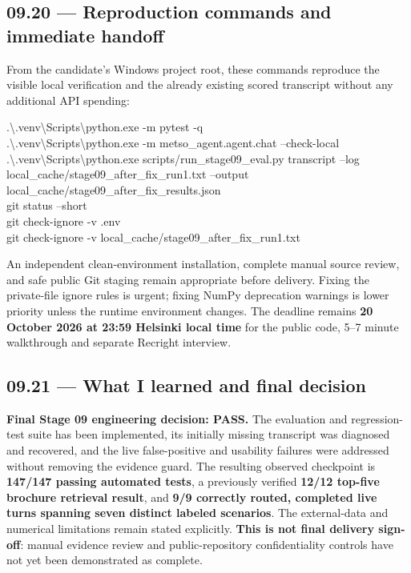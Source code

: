 \documentclass[11pt,a4paper]{article}
\begin{document}
\subsection{09.20 --- Reproduction commands and immediate handoff}
From the candidate's Windows project root, these commands reproduce the visible local verification and the already existing scored transcript without any additional API spending:
\begin{examplebox}
\footnotesize\ttfamily
.\textbackslash.venv\textbackslash Scripts\textbackslash python.exe -m pytest -q\\[2pt]
.\textbackslash.venv\textbackslash Scripts\textbackslash python.exe -m\newline
\hspace*{1.6em}metso\_agent.agent.chat --check-local\\[2pt]
.\textbackslash.venv\textbackslash Scripts\textbackslash python.exe\newline
\hspace*{1.6em}scripts/run\_stage09\_eval.py transcript\newline
\hspace*{1.6em}--log local\_cache/stage09\_after\_fix\_run1.txt\newline
\hspace*{1.6em}--output local\_cache/stage09\_after\_fix\_results.json\\[2pt]
git status --short\\[2pt]
git check-ignore -v .env\\[2pt]
git check-ignore -v local\_cache/stage09\_after\_fix\_run1.txt
\end{examplebox}
An independent clean-environment installation, complete manual source review, and safe public Git staging remain appropriate before delivery. Fixing the private-file ignore rules is urgent; fixing NumPy deprecation warnings is lower priority unless the runtime environment changes. The deadline remains \textbf{20 October 2026 at 23:59 Helsinki local time} for the public code, 5--7 minute walkthrough and separate Recright interview.

\subsection{09.21 --- What I learned and final decision}
\begin{keybox}
\textbf{Final Stage 09 engineering decision: PASS.} The evaluation and regression-test suite has been implemented, its initially missing transcript was diagnosed and recovered, and the live false-positive and usability failures were addressed without removing the evidence guard. The resulting observed checkpoint is \textbf{147/147 passing automated tests}, a previously verified \textbf{12/12 top-five brochure retrieval result}, and \textbf{9/9 correctly routed, completed live turns spanning seven distinct labeled scenarios}. The external-data and numerical limitations remain stated explicitly. \textbf{This is not final delivery sign-off}: manual evidence review and public-repository confidentiality controls have not yet been demonstrated as complete.
\end{keybox}
\end{document}

